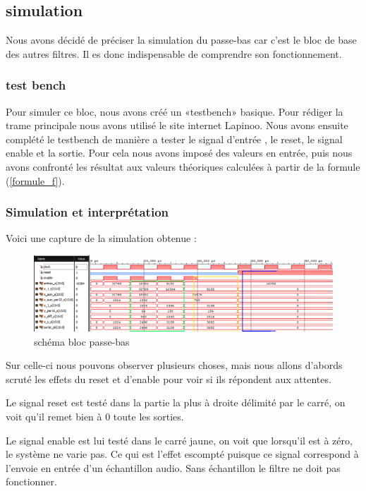 \documentclass[hidelinks]{article}
\begin{document}
    \subsection{simulation}
	Nous avons décidé de préciser la simulation du passe-bas car c'est le bloc de base des autres filtres. Il es donc indispensable de comprendre son fonctionnement.

    
    \subsubsection{test bench}
    Pour simuler ce bloc, nous avons créé un «testbench» basique. Pour rédiger la trame principale nous avons utilisé le site internet Lapinoo\cite{lapinoo}. Nous avons ensuite complété le testbench de manière a tester le signal d'entrée , le reset, le signal enable et la sortie. Pour cela nous avons imposé des valeurs en entrée, puis nous avons confronté les résultat aux valeurs théoriques calculées à partir de la formule (\ref{formule_f}).\\
    
    \subsubsection{Simulation et interprétation}
    Voici une capture de la simulation obtenue :
    \begin{figure}[h]
    	\centering
    	\includegraphics[width=15cm, keepaspectratio=true]{simu_pb_1.PNG}
    	\caption{schéma bloc passe-bas}
	\end{figure}
	Sur celle-ci nous pouvons observer plusieurs choses, mais nous allons d'abords scruté les effets du reset et d'enable pour voir si ils répondent aux attentes.
	
	Le signal reset est testé dans la partie la plus à droite délimité par le carré, on voit qu'il remet bien à 0 toute les sorties.
    
    
    Le signal enable est lui testé dans le carré jaune, on voit que lorsqu'il est à zéro, le système ne varie pas. Ce qui est l'effet escompté puisque ce signal correspond à l'envoie en entrée d'un échantillon audio. Sans échantillon le filtre ne doit pas fonctionner.
    
\end{document}
